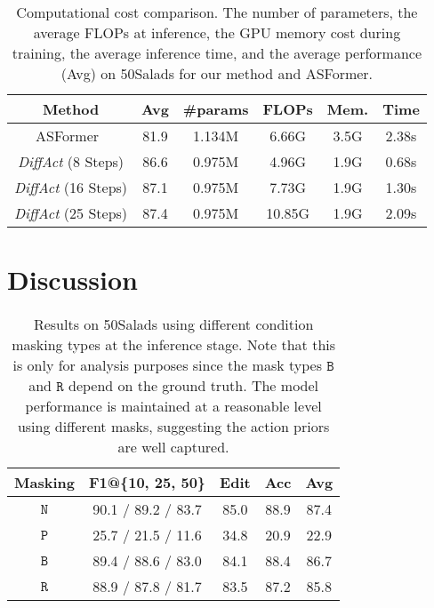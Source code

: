 \documentclass[10pt,twocolumn,letterpaper]{article}
\begin{document}
\begin{table}[t]
\begin{center}
\footnotesize
\begin{tabular}{c | c | c c c c}
\hline
Method & Avg & \#params & FLOPs & Mem. & Time\\
\hline
ASFormer~\cite{2021_BMVC_Yi} & 81.9 & 1.134M & 6.66G & 3.5G & 2.38s\\ 
{\textit{DiffAct}} (8 Steps) & 86.6 & 0.975M & 4.96G & 1.9G & 0.68s\\ 
{\textit{DiffAct}} (16 Steps) & 87.1 & 0.975M & 7.73G & 1.9G & 1.30s\\ 
{\textit{DiffAct}} (25 Steps) & 87.4 & 0.975M & 10.85G & 1.9G & 2.09s\\ 
\hline
\end{tabular}
\end{center}
\caption{Computational cost comparison. The number of parameters, the average FLOPs at inference, the GPU memory cost during training, the average inference time, and the average performance (Avg) on 50Salads for our method and ASFormer.}
\label{table:cost}
\end{table}



\section{Discussion}


\begin{table}[t]
\begin{center}
\footnotesize
\begin{tabular}{c | c c c c c c }
\hline
 Masking & \multicolumn{3}{c}{F1@\{10, 25, 50\}} & Edit & Acc & Avg \\
\hline
$\mathtt{N}$ & \multicolumn{3}{c}{ {90.1} / {89.2} / {83.7} } & {85.0} & {88.9} & {87.4}\\
$\mathtt{P}$ & \multicolumn{3}{c}{ 25.7 / 21.5 / 11.6 } & 34.8 & 20.9 & 22.9\\
$\mathtt{B}$ & \multicolumn{3}{c}{ 89.4 / 88.6 / 83.0 } & 84.1 & 88.4 & 86.7\\
$\mathtt{R}$ & \multicolumn{3}{c}{ 88.9 / 87.8 / 81.7 } & 83.5 & 87.2 & 85.8\\
\hline
\end{tabular}
\end{center}
\caption{Results on 50Salads using different condition masking types at the inference stage. Note that this is only for analysis purposes since the mask types $\mathtt{B}$ and $\mathtt{R}$ depend on the ground truth. The model performance is maintained at a reasonable level using different masks, suggesting the action priors are well captured.}
\label{table:ablation-mask-inference}
\end{table}
\end{document}
